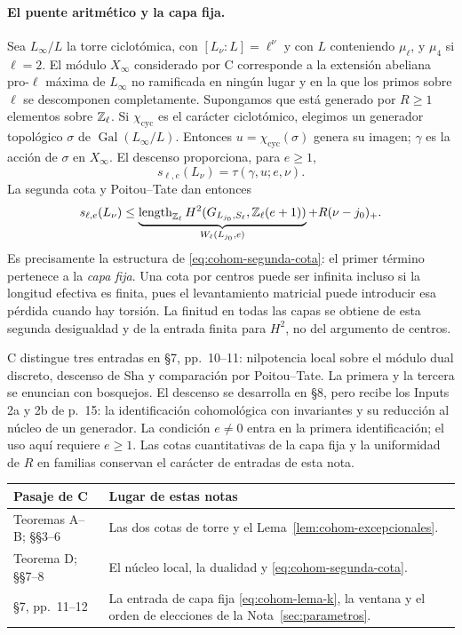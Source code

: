 \paragraph{El puente aritmético y la capa fija.}
Sea $L_\infty/L$ la torre ciclotómica, con $[L_\nu:L]=\ell^\nu$
y con $L$ conteniendo
$\mu_\ell$, y $\mu_4$ si $\ell=2$.
El módulo $X_\infty$ considerado por C corresponde a la extensión
abeliana pro-$\ell$ máxima de $L_\infty$ no ramificada en ningún
lugar y en la que los primos sobre $\ell$ se descomponen completamente.
Supongamos que está generado por $R\ge1$ elementos sobre $\mathbb{Z}_\ell$.
Si $\chi_{\mathrm{cyc}}$ es el carácter ciclotómico, elegimos un
generador topológico $\sigma$ de $\operatorname{Gal}(L_\infty/L)$.
Entonces $u=\chi_{\mathrm{cyc}}(\sigma)$ genera su imagen;
$\gamma$ es la acción de $\sigma$ en $X_\infty$.
El descenso proporciona, para $e\ge1$,
\[
 s_{\ell,e}(L_\nu)=\tau(\gamma,u;e,\nu).
\]
La segunda cota y Poitou--Tate dan entonces
\[
 s_{\ell,e}(L_\nu)
 \le
 \underbrace{\operatorname{length}_{\mathbb{Z}_\ell}
 H^2(G_{L_{j_0},S_\ell},\mathbb{Z}_\ell(e+1))}_{W_\ell(L_{j_0},e)}
 +R(\nu-j_0)_+.
\]
Es precisamente la estructura de \eqref{eq:cohom-segunda-cota}:
el primer término pertenece a la \emph{capa fija}.
Una cota por centros puede ser infinita incluso si la longitud
efectiva es finita, pues el levantamiento matricial puede introducir
esa pérdida cuando hay torsión.
La finitud en todas las capas se obtiene de esta segunda desigualdad
y de la entrada finita para $H^2$, no del argumento de centros.

C distingue tres entradas en §7, pp.~10--11:
nilpotencia local sobre el módulo dual discreto, descenso de Sha
y comparación por Poitou--Tate.
La primera y la tercera se enuncian con bosquejos.
El descenso se desarrolla en §8, pero recibe los Inputs 2a y 2b
de p.~15: la identificación cohomológica con invariantes y su
reducción al núcleo de un generador.
La condición $e\ne0$ entra en la primera identificación;
el uso aquí requiere $e\ge1$.
Las cotas cuantitativas de la capa fija y la uniformidad de $R$
en familias conservan el carácter de entradas de esta nota.

\begin{center}
\small
\begin{tabularx}{\textwidth}{@{}p{}Y@{}}
\toprule
Pasaje de C & Lugar de estas notas \\
\midrule
Teoremas A--B; §§3--6 &
Las dos cotas de torre y el
Lema~\ref{lem:cohom-excepcionales}.\\
Teorema D; §§7--8 &
El núcleo local, la dualidad y
\eqref{eq:cohom-segunda-cota}.\\
§7, pp.~11--12 &
La entrada de capa fija \eqref{eq:cohom-lema-k},
la ventana y el orden de elecciones de la
Nota~\ref{sec:parametros}.\\
\bottomrule
\end{tabularx}
\end{center}

